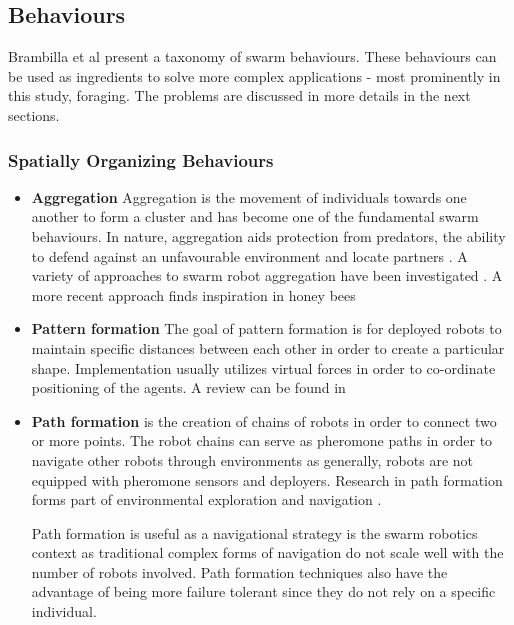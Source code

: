 \subsection{Behaviours}
\label{swarmrobotapplications}

Brambilla et al \cite{brambilla2013swarm} present a taxonomy of swarm behaviours. These behaviours can be used as ingredients to solve more complex applications - most prominently in this study, foraging. The problems are discussed in more details in the next sections.

\subsubsection{Spatially Organizing Behaviours}

\begin{itemize}
	\item \textbf{Aggregation} Aggregation is the movement of individuals towards one another to form a cluster and has become one of the fundamental swarm behaviours. In nature, aggregation aids protection from predators, the ability to defend against an unfavourable environment and locate partners \cite{bonabeau2001self}. A variety of approaches to swarm robot aggregation have been investigated \cite{yan2011algorithm, soysal2007aggregation, trianni2003evolving, dimarogonas2008connectedness }. A more recent approach finds inspiration in honey bees \cite{schmickl2011beeclust, schmickl2009two}
	
	\item \textbf{Pattern formation}
	The goal of pattern formation is for deployed robots to maintain specific distances between each other in order to create a particular shape. Implementation usually utilizes virtual forces in order to co-ordinate positioning of the agents. A review can be found in \cite{bahceci2003review, hettiarachchi2009review}
	
	\item \textbf{Path formation} is the creation of chains of robots in order to connect two or more points. The robot chains can serve as pheromone paths in order to navigate other robots through environments as generally, robots are not equipped with pheromone sensors and deployers. Research in path formation forms part of environmental exploration and navigation \cite{nouyan2006chain}. 
	
	Path formation is useful as a navigational strategy is the swarm robotics context as traditional complex forms of navigation do not scale well with the number of robots involved. Path formation techniques also have the advantage of being more failure tolerant since they do not rely on a specific individual.
	

\end{itemize}
